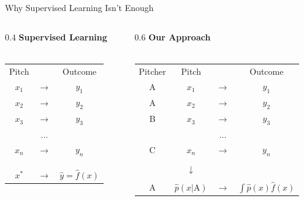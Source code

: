 \documentclass{beamer}
\begin{document}
  \begin{frame}{Why Supervised Learning Isn't Enough}
    \begin{columns}
      \begin{column}{0.4\columnwidth}
        \centering
        {\bf Supervised Learning}\\
        ~\\
        \begin{tabular}{ccc}
          Pitch &               & Outcome\\
          $x_1$ & $\rightarrow$ & $y_1$\\
          $x_2$ & $\rightarrow$ & $y_2$\\
          $x_3$ & $\rightarrow$ & $y_3$\\
                & ...           &      \\
          $x_n$ & $\rightarrow$ & $y_n$\\
          \\
          \\
          \\
          $x^*$ & $\rightarrow$ & $\hat y = \hat f(x)$\\
        \end{tabular}
      \end{column}
      \begin{column}{0.6\columnwidth}
        \centering
        \alert{\bf Our Approach}\\
        ~\\
        \begin{tabular}{cccc}
          Pitcher & Pitch &               & Outcome\\
          A       & $x_1$ & $\rightarrow$ & $y_1$\\
          A       & $x_2$ & $\rightarrow$ & $y_2$\\
          B       & $x_3$ & $\rightarrow$ & $y_3$\\
                  &       & ...           &      \\
          C       & $x_n$ & $\rightarrow$ & $y_n$\\
                  & \\
                  & \alert{$\downarrow$}\\
                  & \\
          A       & \alert{$\hat p(x|\text{A})$} & \alert{$\rightarrow$} & \alert{$\int\hat p(x)\hat f(x)$}\\
        \end{tabular}
      \end{column}
    \end{columns}
  \end{frame}
\end{document}
